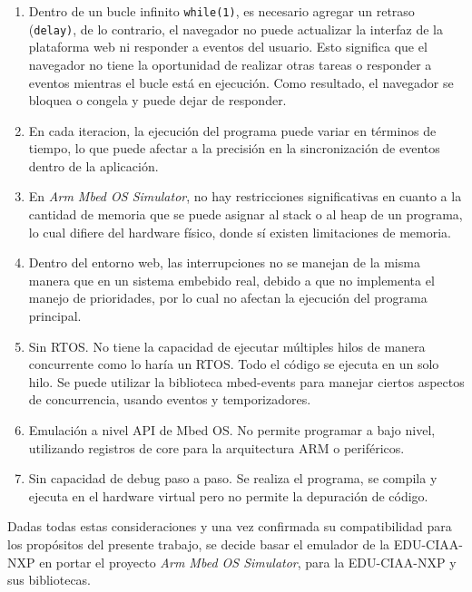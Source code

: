 \begin{enumerate}
	\item Dentro de un bucle infinito \texttt{while(1)}, es necesario agregar un retraso \newline(\texttt{delay)}, de lo contrario, el navegador no puede actualizar la interfaz de la plataforma web ni responder a eventos del usuario. Esto significa que el navegador no tiene la oportunidad de realizar otras tareas o responder a eventos mientras el bucle está en ejecución. Como resultado, el navegador se bloquea o congela y puede dejar de responder.
	
	\item En cada iteracion, la ejecución del programa puede variar en términos de tiempo, lo que puede afectar a la precisión en la sincronización de eventos dentro de la aplicación.

	\item En \textit{Arm Mbed OS Simulator}, no hay restricciones significativas en cuanto a la cantidad de memoria que se puede asignar al stack o al heap  de un programa, lo cual difiere del hardware físico, donde sí existen limitaciones de memoria.
	
	\item Dentro del entorno web, las interrupciones no se manejan de la misma manera que en un sistema embebido real, debido a que no implementa el manejo de prioridades, por lo cual no afectan la ejecución del programa principal.
	
	\item Sin RTOS. No tiene la capacidad de ejecutar múltiples hilos de manera concurrente como lo haría un RTOS. Todo el código se ejecuta en un solo hilo. Se puede utilizar la biblioteca mbed-events para manejar ciertos aspectos de concurrencia, usando eventos y temporizadores.
	
	\item Emulación a nivel API de Mbed OS. No permite programar a bajo nivel, utilizando registros de core para la arquitectura ARM o periféricos.
	
	\item Sin capacidad de debug paso a paso. Se realiza el programa, se compila y ejecuta en el hardware virtual pero no permite la depuración de código.
\end{enumerate}

Dadas todas estas consideraciones y una vez confirmada su compatibilidad para los propósitos del presente trabajo, se decide basar el emulador de la EDU-CIAA-NXP en portar el proyecto \textit{Arm Mbed OS Simulator}, para la EDU-CIAA-NXP y sus bibliotecas.

